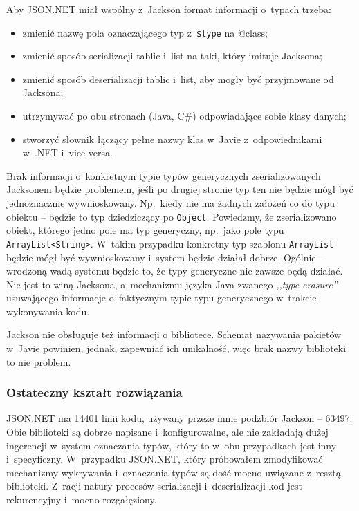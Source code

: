 Aby JSON.NET miał wspólny z~Jackson format informacji o~typach trzeba:
\begin{itemize}
	\item zmienić nazwę pola oznaczającego typ z~\texttt{\$type} na @class;
	\item zmienić sposób serializacji tablic i~list na taki, który imituje Jacksona;
	\item zmienić sposób deserializacji tablic i~list, aby mogły być przyjmowane od Jacksona;
	\item utrzymywać po obu stronach (Java, C\#) odpowiadające sobie klasy danych;
	\item stworzyć słownik łączący pełne nazwy klas w~Javie z~odpowiednikami w~.NET i~vice versa.
\end{itemize}

Brak informacji o~konkretnym typie typów generycznych zserializowanych Jacksonem będzie problemem, jeśli po drugiej stronie typ ten nie będzie mógł być jednoznacznie wywnioskowany. Np.\ kiedy nie ma żadnych założeń co do typu obiektu -- będzie to typ dziedziczący po \texttt{Object}.
Powiedzmy, że zserializowano obiekt, którego jedno pole ma typ generyczny, np.\ jako pole typu \texttt{ArrayList<String>}. W~takim przypadku konkretny typ szablonu \texttt{ArrayList} będzie mógł być wywnioskowany i~system będzie działał dobrze.
Ogólnie -- wrodzoną wadą systemu będzie to, że typy generyczne nie zawsze będą działać.
Nie jest to winą Jacksona, a~mechanizmu języka Java zwanego \emph{,,type erasure''} usuwającego informacje o~faktycznym typie typu generycznego w~trakcie wykonywania kodu.

Jackson nie obsługuje też informacji o bibliotece. Schemat nazywania pakietów w~Javie powinien, jednak, zapewniać ich unikalność, więc brak nazwy biblioteki to nie problem.

\subsubsection{Ostateczny kształt rozwiązania}
JSON.NET ma 14401 linii kodu, używany przeze mnie podzbiór Jackson -- 63497. Obie biblioteki są dobrze napisane i~konfigurowalne, ale nie zakładają dużej ingerencji w~system oznaczania typów, który to w~obu przypadkach jest inny i~specyficzny.
W~przypadku JSON.NET, który próbowałem zmodyfikować mechanizmy wykrywania i~oznaczania typów są dość mocno uwiązane z~resztą biblioteki. Z~racji natury procesów serializacji i~deserializacji kod jest rekurencyjny i~mocno rozgałęziony.

